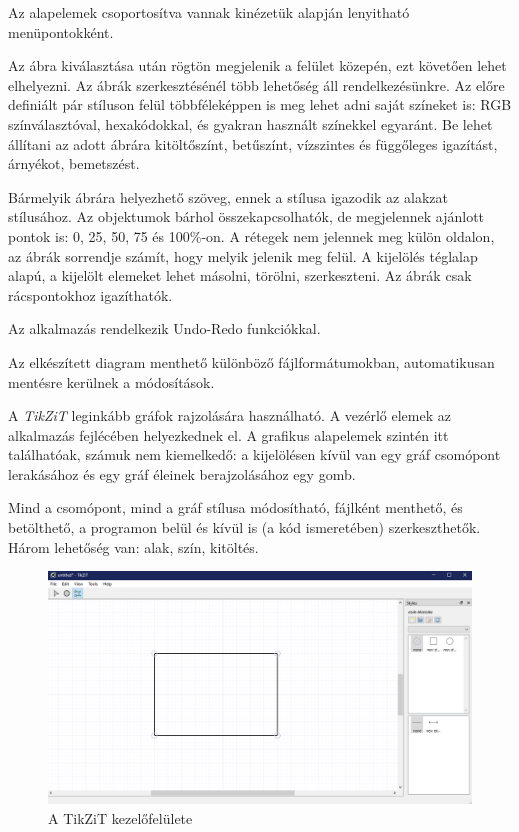 Az alapelemek csoportosítva vannak kinézetük alapján lenyitható menüpontokként. 

Az ábra kiválasztása után rögtön megjelenik a felület közepén, ezt követően lehet elhelyezni. Az ábrák szerkesztésénél több lehetőség áll rendelkezésünkre. Az előre definiált pár stíluson felül többféleképpen is meg lehet adni saját színeket is: RGB színválasztóval, hexakódokkal, és gyakran használt színekkel egyaránt. Be lehet állítani az adott ábrára kitöltőszínt, betűszínt, vízszintes és függőleges igazítást, árnyékot, bemetszést.

Bármelyik ábrára helyezhető szöveg, ennek a stílusa igazodik az alakzat stílusához. Az objektumok bárhol összekapcsolhatók, de megjelennek ajánlott pontok is: 0, 25, 50, 75 és 100\%-on. A rétegek nem jelennek meg külön oldalon, az ábrák sorrendje számít, hogy melyik jelenik meg felül. A kijelölés téglalap alapú, a kijelölt elemeket lehet másolni, törölni, szerkeszteni. Az ábrák csak rácspontokhoz igazíthatók.

Az alkalmazás rendelkezik Undo-Redo funkciókkal. 

Az elkészített diagram menthető különböző fájlformátumokban, automatikusan mentésre kerülnek a módosítások. 



A \textit{TikZiT} leginkább gráfok rajzolására használható. A vezérlő elemek az alkalmazás fejlécében helyezkednek el. A grafikus alapelemek szintén itt találhatóak, számuk nem kiemelkedő: a kijelölésen kívül van egy gráf csomópont lerakásához és egy gráf éleinek berajzolásához egy gomb. 

Mind a csomópont, mind a gráf stílusa módosítható, fájlként menthető, és betölthető, a programon belül és kívül is (a kód ismeretében) szerkeszthetők. Három lehetőség van: alak, szín, kitöltés. 

\begin{figure}[!h]
	\includegraphics[width=\textwidth]{images/tikzit.png}
	\caption{A TikZiT kezelőfelülete \cite{tikzit}}
	\label{fig:tikzit}
\end{figure}

